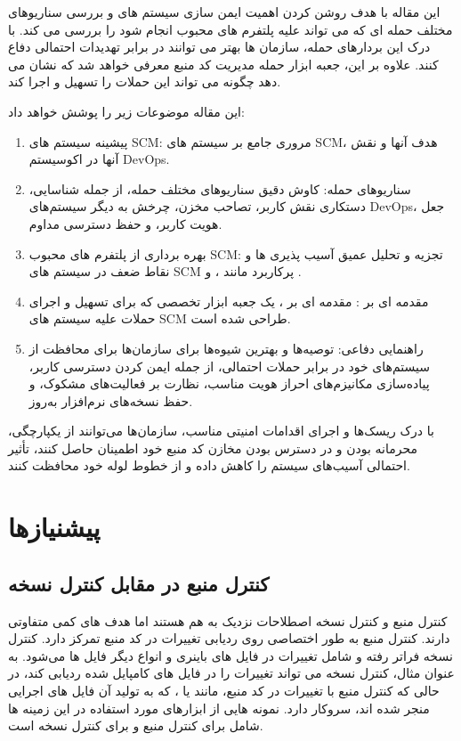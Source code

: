 \documentclass{CSICC}
\begin{document}
این مقاله با هدف روشن کردن اهمیت ایمن سازی سیستم های
 و بررسی سناریوهای مختلف حمله ای که می تواند علیه پلتفرم های محبوب
   انجام شود را بررسی می کند. با درک این بردارهای حمله، سازمان ها بهتر می توانند در برابر تهدیدات احتمالی دفاع کنند. علاوه بر این، جعبه ابزار حمله مدیریت کد منبع
   معرفی خواهد شد که نشان می دهد چگونه می تواند این حملات را تسهیل و اجرا کند.

این مقاله موضوعات زیر را پوشش خواهد داد:



\begin{enumerate}
\item 
پیشینه سیستم های {SCM}\lr: مروری جامع بر سیستم های {SCM}\lr، هدف آنها و نقش آنها در اکوسیستم {DevOps}\lr.
\item
سناریوهای حمله: کاوش دقیق سناریوهای مختلف حمله، از جمله شناسایی، دستکاری نقش کاربر، تصاحب مخزن، چرخش به دیگر سیستم‌های {DevOps}\lr، جعل هویت کاربر، و حفظ دسترسی مداوم.
\item
بهره برداری از پلتفرم های محبوب {SCM}\lr: تجزیه و تحلیل عمیق آسیب پذیری ها و نقاط ضعف در سیستم های
 {SCM}\lr  
 پرکاربرد مانند
 ، 
  و 
  .

\item 
مقدمه ای بر
 : مقدمه ای بر
  ، یک جعبه ابزار تخصصی که برای تسهیل و اجرای حملات علیه سیستم های SCM طراحی شده است.

\item 
راهنمایی دفاعی: توصیه‌ها و بهترین شیوه‌ها برای سازمان‌ها برای محافظت از سیستم‌های
  خود در برابر حملات احتمالی، از جمله ایمن کردن دسترسی کاربر، پیاده‌سازی مکانیزم‌های احراز هویت مناسب، نظارت بر فعالیت‌های مشکوک، و حفظ نسخه‌های نرم‌افزار به‌روز.
\end{enumerate}

با درک ریسک‌ها و اجرای اقدامات امنیتی مناسب، سازمان‌ها می‌توانند از یکپارچگی، محرمانه بودن و در دسترس بودن مخازن کد منبع خود اطمینان حاصل کنند، تأثیر احتمالی آسیب‌های سیستم
  را کاهش داده و از خطوط لوله
    خود محافظت کنند.


\section{پیشنیازها}
\subsection{کنترل منبع در مقابل کنترل نسخه}
کنترل منبع و کنترل نسخه اصطلاحات نزدیک به هم هستند اما هدف‌ های کمی متفاوتی دارند. کنترل منبع به طور اختصاصی روی ردیابی تغییرات در کد منبع تمرکز دارد. کنترل نسخه فراتر رفته و شامل تغییرات در فایل‌ های باینری و انواع دیگر فایل‌ ها می‌شود. به عنوان مثال، کنترل نسخه می‌ تواند تغییرات را در فایل های کامپایل شده ردیابی کند، در حالی که کنترل منبع با تغییرات در کد منبع، مانند
  یا
   ، که به تولید آن فایل های اجرایی‌ منجر شده‌ اند، سروکار دارد. نمونه ‌هایی از ابزارهای مورد استفاده در این زمینه‌ ها شامل
    برای کنترل منبع و
     برای کنترل نسخه است.
\end{document}
